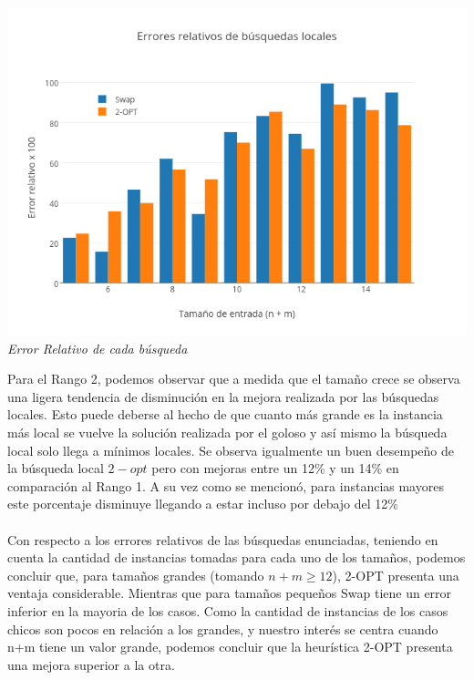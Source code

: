   \vspace*{0.3cm} \vspace*{0.3cm}
  \begin{center}
	\includegraphics[scale=0.50]{./EJ3/randomError.png}
	\label{fig:randomError}	
	\\{\textit{Error Relativo de cada búsqueda}}
  \end{center}
  \vspace*{0.3cm} 


Para el Rango 2, podemos observar que a medida que el tamaño crece se observa una ligera tendencia de disminución en la mejora realizada por las búsquedas locales. Esto puede deberse al hecho de que cuanto más grande es la instancia más local se vuelve la solución realizada por el goloso y así mismo la búsqueda local solo llega a mínimos locales. Se observa igualmente un buen desempeño de la búsqueda local $2-opt$ pero con mejoras entre un 12\% y un 14\% en comparación al Rango 1. A su vez como se mencionó, para instancias mayores este porcentaje disminuye llegando a estar incluso por debajo del 12\%
\\\\
 
 Con respecto a los errores relativos de las búsquedas enunciadas, teniendo en cuenta la cantidad de instancias tomadas para cada uno de los tamaños, podemos concluir que, para tamaños grandes (tomando $n+m \geq 12$), 2-OPT presenta una ventaja considerable. Mientras que para tamaños pequeños Swap tiene un error inferior en la mayoria de los casos. Como la cantidad de instancias de los casos chicos son pocos en relaci\'on a los grandes, y nuestro inter\'es se centra cuando n+m tiene un valor grande, podemos concluir que la heurística 2-OPT presenta una mejora superior a la otra.
\newpage
